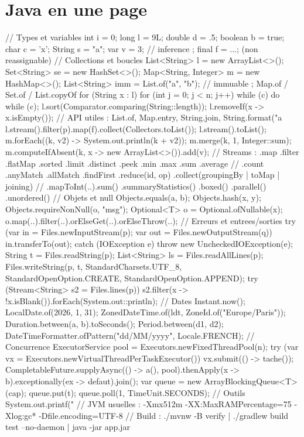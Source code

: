 \documentclass[12pt,a4paper,twoside,openright]{book}
\begin{document}
\section{Java en une page}

\begin{codejava}
// Types et variables
int i = 0; long l = 9L; double d = .5; boolean b = true; char c = 'x'; String s = "a";
var v = 3;                                  // inference ; final f = ...; (non reassignable)
// Collections et boucles
List<String> l = new ArrayList<>(); Set<String> se = new HashSet<>(); Map<String, Integer> m = new HashMap<>();
List<String> imm = List.of("a", "b");       // immuable ; Map.of / Set.of / List.copyOf
for (String x : l) { } for (int j = 0; j < n; j++) { } while (c) { } do { } while (c);
l.sort(Comparator.comparing(String::length)); l.removeIf(x -> x.isEmpty());
// API utiles : List.of, Map.entry, String.join, String.format("a %
l.stream().filter(p).map(f).collect(Collectors.toList()); l.stream().toList();
m.forEach((k, v2) -> System.out.println(k + v2)); m.merge(k, 1, Integer::sum);
m.computeIfAbsent(k, x -> new ArrayList<>()).add(v);
// Streams : .map .filter .flatMap .sorted .limit .distinct .peek .min .max .sum .average
// .count .anyMatch .allMatch .findFirst .reduce(id, op) .collect(groupingBy | toMap | joining)
// .mapToInt(..).sum() .summaryStatistics() .boxed() .parallel() .unordered()
// Objets et null
Objects.equals(a, b); Objects.hash(x, y); Objects.requireNonNull(o, "msg");
Optional<T> o = Optional.ofNullable(x); o.map(..).filter(..).orElseGet(..).orElseThrow(..);
// Erreurs et entrees/sorties
try (var in = Files.newInputStream(p); var out = Files.newOutputStream(q)) { in.transferTo(out); }
catch (IOException e) { throw new UncheckedIOException(e); }
String t = Files.readString(p); List<String> ls = Files.readAllLines(p);
Files.writeString(p, t, StandardCharsets.UTF_8, StandardOpenOption.CREATE, StandardOpenOption.APPEND);
try (Stream<String> s2 = Files.lines(p)) { s2.filter(x -> !x.isBlank()).forEach(System.out::println); }
// Dates
Instant.now(); LocalDate.of(2026, 1, 31); ZonedDateTime.of(ldt, ZoneId.of("Europe/Paris"));
Duration.between(a, b).toSeconds(); Period.between(d1, d2); DateTimeFormatter.ofPattern("dd/MM/yyyy", Locale.FRENCH);
// Concurrence
ExecutorService pool = Executors.newFixedThreadPool(n);
try (var vx = Executors.newVirtualThreadPerTaskExecutor()) { vx.submit(() -> tache()); }
CompletableFuture.supplyAsync(() -> a(), pool).thenApply(x -> b).exceptionally(ex -> defaut).join();
var queue = new ArrayBlockingQueue<T>(cap); queue.put(t); queue.poll(1, TimeUnit.SECONDS);
// Outils
System.out.printf("%
// JVM usuelles : -Xmx512m -XX:MaxRAMPercentage=75 -Xlog:gc* -Dfile.encoding=UTF-8
// Build : ./mvnw -B verify | ./gradlew build test --no-daemon | java -jar app.jar
\end{codejava}
\end{document}

